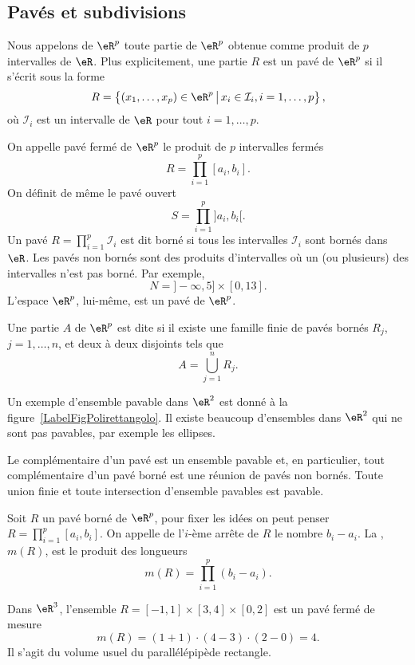 \subsection{Pavés et subdivisions}

\begin{definition}
	Nous appelons  de \( \eR^p\) toute partie de \( \eR^p\) obtenue comme produit de \( p\) intervalles de \( \eR\). Plus explicitement, une partie \( R\) est un pavé de \( \eR^p\) si il s'écrit sous la forme
	\[
		R=\left\{(x_1,\ldots, x_p)\in\eR^p \,\big\vert\,x_i\in \mathcal{I}_i,  i=1,\ldots, p  \right\},
	\]
	où \( \mathcal{I}_i\) est un intervalle de \( \eR\) pour tout \( i=1,\ldots, p\).
\end{definition}
On appelle pavé fermé de \( \eR^p\) le produit de \( p\) intervalles fermés
\[
	R=\prod_{i=1}^{p}[a_i,b_i].
\]
On définit de même le pavé ouvert
\[
	S=\prod_{i=1}^{p}]a_i,b_i[.
\]
Un pavé \(  R=\prod_{i=1}^{p}\mathcal{I}_i\) est dit borné si tous les intervalles \( \mathcal{I}_i\) sont bornés dans \( \eR\). Les pavés non bornés sont des produits d'intervalles où un (ou plusieurs) des intervalles n'est pas borné. Par exemple,
\[
	N=]-\infty, 5]\times [0,13].
\]
L'espace \( \eR^p\), lui-même, est un pavé de \( \eR^p\).
\begin{definition}
	Une partie \( A\) de \( \eR^p\) est dite   si il existe une famille finie de pavés bornés \( R_j\), \( j=1,\ldots, n\), et deux à deux disjoints tels que
	\[
		A=\bigcup_{j=1}^{n}R_j.
	\]
\end{definition}
Un exemple d'ensemble pavable dans \( \eR^2\) est donné à la figure~\ref{LabelFigPolirettangolo}. Il existe beaucoup d'ensembles dans \( \eR^2\) qui ne sont pas pavables, par exemple les ellipses.
\newcommand{\CaptionFigPolirettangolo}{Un ensemble pavable.}


Le complémentaire d'un pavé est  un ensemble pavable et, en particulier, tout complémentaire d'un pavé borné est une réunion de  pavés non bornés. Toute union finie et toute intersection d'ensemble pavables est pavable.
\begin{definition}
	Soit \( R\) un pavé borné de \( \eR^p\), pour fixer les idées on peut penser \( R=\prod_{i=1}^{p}[a_i,b_i]\). On appelle  de l'\( i\)-ème arrête de \( R\) le nombre \( b_i-a_i\). La , \( m(R)\), est le produit des longueurs
	\[
		m(R)=\prod_{i=1}^{p}(b_i-a_i).
	\]
\end{definition}
\begin{example}
	Dans \( \eR^3\), l'ensemble \( R=[-1,1]\times[3,4]\times[0,2]\) est un pavé fermé de mesure
	\[
		m(R)= (1+1)\cdot(4-3)\cdot(2-0)=4.
	\]
	Il s'agit du volume usuel du parallélépipède rectangle.
\end{example}

